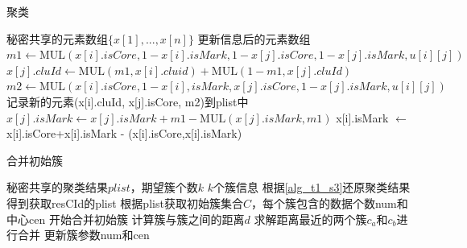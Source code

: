 \begin{algorithm}[htbp]
	\renewcommand{\algorithmicrequire}{\textbf{输入:}}
	\renewcommand{\algorithmicensure}{\textbf{输出:}}
	\caption{聚类}
	\label{alg_t3_s2-2} %
	\begin{algorithmic}[1]
		\REQUIRE 秘密共享的元素数组$ \{x[1],...,x[n]\} $
		\ENSURE 更新信息后的元素数组
		\STATE $ m1 \leftarrow \text{MUL}(x[i].isCore,1-x[i].isMark, 1- x[j].isCore, 1-x[j].isMark, u[i][j]) $
		\STATE $x[j].cluId \leftarrow \text{MUL}(m1, x[i].cluid) + \text{MUL}(1-m1, x[j].cluId)$
		\STATE $ m2 \leftarrow \text{MUL}(x[i].isCore, 1-x[i],isMark, x[j].isCore, 1-x[j].isMark, u[i][j]) $
		\STATE 记录新的元素(x[i].cluId, x[j].isCore, m2)到plist中
		\STATE $ x[j].isMark \leftarrow x[j].isMark + m1 - \text{MUL}(x[j].isMark, m1) $
		\ENDFOR
		\ENDFOR
		\STATE  x[i].isMark $ \leftarrow $ x[i].isCore+x[i].isMark - (x[i].isCore,x[i].isMark)
		\ENDFOR
		
	\end{algorithmic}
\end{algorithm}

\begin{algorithm}[htbp]
	\renewcommand{\algorithmicrequire}{\textbf{输入:}}
	\renewcommand{\algorithmicensure}{\textbf{输出:}}
	\caption{合并初始簇}
	\label{alg_t3_s3}
	\begin{algorithmic}[1]
		\REQUIRE 秘密共享的聚类结果$plist$，期望簇个数$k$
		\ENSURE $k$个簇信息
		\STATE 根据\ref{alg_t1_s3}还原聚类结果得到获取resCId的plist
		\STATE 根据plist获取初始簇集合$ C $，每个簇包含的数据个数num和中心cen
		\STATE 开始合并初始簇
		\STATE 计算簇与簇之间的距离$d$
		\STATE 求解距离最近的两个簇$c_a$和$c_b$进行合并
		\STATE 更新簇参数num和cen
		\ENDWHILE
	\end{algorithmic}
\end{algorithm}
